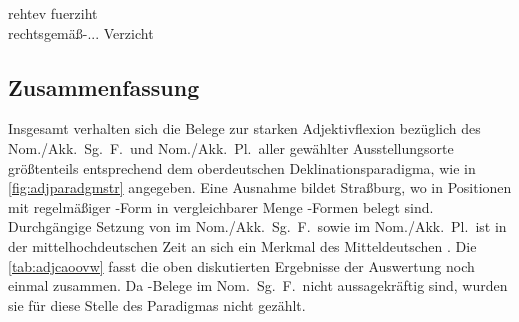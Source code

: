 \begin{exe}
\ex \label{ex:adjwienakksgf_4}
	\gll rehtev	fuerziht \\
		rechtsgemäß-\Acc.\Sg.\FemI.\St{} Verzicht \\
	\begin{taggedline}{\parencites(Wien, 1296)[\pno~2424, 500.7]{cao3}}
	\trans {}
	\end{taggedline}
\end{exe}

\subsection{Zusammenfassung}

Insgesamt verhalten sich die Belege zur starken Adjektivflexion bezüglich des
Nom./\allowbreak{}Akk.\ Sg.~F.\ und Nom./Akk.\ Pl.\ aller gewählter
Ausstellungs\-orte größtenteils entsprechend dem oberdeutschen
Deklinationsparadigma, wie in \cref{fig:adjparadgmstr} angegeben. Eine Ausnahme
bildet Straßburg, wo in Positionen mit regelmäßiger -Form in
vergleichbarer Menge -Formen belegt sind. Durchgängige Setzung von
 im Nom./Akk.\ Sg.~F.\ sowie im Nom./Akk.\ Pl.\ ist in der
mittelhochdeutschen Zeit an sich ein Merkmal des Mitteldeutschen
\autocites[181]{ksw2}[vgl.~auch][832]{wiesinger1983}. Die
\cref{tab:adjcaoovw} fasst die oben diskutierten Ergebnisse der Auswertung noch
einmal zusammen. Da -Belege im Nom.\ Sg.~F.\ nicht aussagekräftig
sind, wurden sie für diese Stelle des Paradigmas nicht gezählt.

